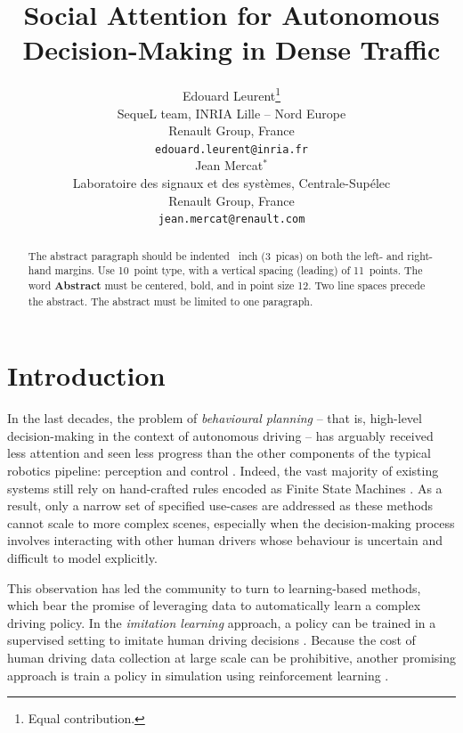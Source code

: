 \documentclass{article}
\title{Social Attention for Autonomous Decision-Making in Dense Traffic}
\author{%
  Edouard Leurent\thanks{Equal contribution.} \\
  SequeL team, INRIA Lille -- Nord Europe\\
  Renault Group, France\\
  \texttt{edouard.leurent@inria.fr} \\
   \And
  Jean Mercat$^*$ \\
  Laboratoire des signaux et des syst\`emes, Centrale-Sup\'elec\\
  Renault Group, France\\
  \texttt{jean.mercat@renault.com} \\
}
\begin{document}
	
	
	
	

\maketitle

\begin{abstract}
  The abstract paragraph should be indented ~inch (3~picas) on
  both the left- and right-hand margins. Use 10~point type, with a vertical
  spacing (leading) of 11~points.  The word \textbf{Abstract} must be centered,
  bold, and in point size 12. Two line spaces precede the abstract. The abstract
  must be limited to one paragraph.
\end{abstract}

\section{Introduction}

In the last decades, the problem of \emph{behavioural planning} -- that is, high-level decision-making in the context of autonomous driving -- has arguably received less attention and seen less progress than the other components of the typical robotics pipeline: perception and control \citep{architecture}. Indeed, the vast majority of existing systems still rely on hand-crafted rules encoded as Finite State Machines \citep{fsm}. As a result, only a narrow set of specified use-cases are addressed as these methods cannot scale to more complex scenes, especially when the decision-making process involves interacting with other human drivers whose behaviour is uncertain and difficult to model explicitly.

This observation has led the community to turn to learning-based methods, which bear the promise of leveraging data to automatically learn a complex driving policy. In the \emph{imitation learning} approach, a policy can be trained in a supervised setting to imitate human driving decisions \citep{supervised, waymo}. Because the cost of human driving data collection at large scale can be prohibitive, another promising approach is train a policy in simulation using reinforcement learning \citep{examples}.
\end{document}
